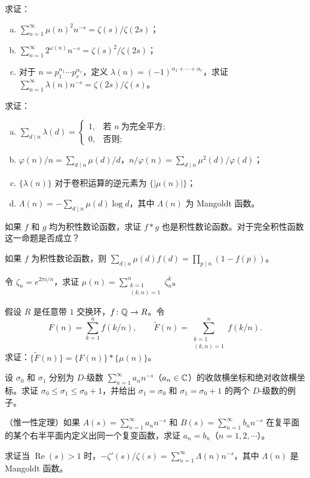 \begin{Exercises}
  \item 求证：
  \begin{enumerate}[(a)]
    \item $\sum_{n=1}^{\infty}\mu(n)^2n^{-s}=\zeta(s)/\zeta(2s)$；
    \item $\sum_{n=1}^{\infty}2^{\omega(n)}n^{-s}=\zeta(s)^2/\zeta(2s)$；
    \item 对于 $n=p_1^{\alpha_1}\cdots p_r^{\alpha_r}$，定义 $\lambda(n)=(-1)^{\alpha_1+\cdots+\alpha_r}$，求证 $\sum_{n=1}^{\infty}\lambda(n)n^{-s}=\zeta(2s)/\zeta(s)$。
  \end{enumerate}
  \item 求证：
  \begin{enumerate}[(a)]
    \item $\sum_{d\mid n}\lambda(d)=\begin{cases}1, & \text{若 } n\ \text{为完全平方};\\ 0, & \text{否则};\end{cases}$
    \item $\varphi(n)/n=\sum_{d\mid n}\mu(d)/d$，$n/\varphi(n)=\sum_{d\mid n}\mu^2(d)/\varphi(d)$；
    \item $\{\lambda(n)\}$ 对于卷积运算的逆元素为 $\{|\mu(n)|\}$；
    \item $\Lambda(n)=-\sum_{d\mid n}\mu(d)\log d$，其中 $\Lambda(n)$ 为 Mangoldt 函数。
  \end{enumerate}
  \item 如果 $f$ 和 $g$ 均为积性数论函数，求证 $f*g$ 也是积性数论函数。对于完全积性函数这一命题是否成立？
  \item 如果 $f$ 为积性数论函数，则 $\sum_{d\mid n}\mu(d)f(d)=\prod_{p\mid n}(1-f(p))$。
  \item 令 $\zeta_n=e^{2\pi i/n}$，求证 $\mu(n)=\sum_{\substack{k=1\\ (k,n)=1}}^{n}\zeta_n^k$。
  \item 假设 $R$ 是任意带 $1$ 交换环，$f\colon\mathbb{Q}\to R$。令
  \[
    F(n)=\sum_{k=1}^{n}f(k/n),\qquad \widetilde{F}(n)=\sum_{\substack{k=1\\ (k,n)=1}}^{n}f(k/n).
  \]
  求证：$\{\widetilde{F}(n)\}=\{F(n)\}*\{\mu(n)\}$。
  \item 设 $\sigma_0$ 和 $\sigma_1$ 分别为 $D$-级数 $\sum_{n=1}^{\infty}a_nn^{-s}$（$a_n\in\mathbb{C}$）的收敛横坐标和绝对收敛横坐标。求证 $\sigma_0\leqslant\sigma_1\leqslant\sigma_0+1$，并给出 $\sigma_1=\sigma_0$ 和 $\sigma_1=\sigma_0+1$ 的两个 $D$-级数的例子。
  \item （惟一性定理）如果 $A(s)=\sum_{n=1}^{\infty}a_nn^{-s}$ 和 $B(s)=\sum_{n=1}^{\infty}b_nn^{-s}$ 在复平面的某个右半平面内定义出同一个复变函数，求证 $a_n=b_n$（$n=1,2,\cdots$）。
  \item 求证当 $\operatorname{Re}(s)>1$ 时，$-\zeta'(s)/\zeta(s)=\sum_{n=1}^{\infty}\Lambda(n)n^{-s}$，其中 $\Lambda(n)$ 是 Mangoldt 函数。
\end{Exercises}
